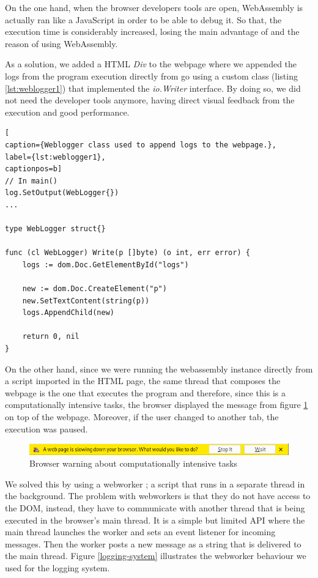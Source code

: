 On the one hand, when the browser developers tools are open, WebAssembly is actually ran like a JavaScript in order to be able to debug it. So that, the execution time is considerably increased, losing the main advantage of and the reason of using WebAssembly.

As a solution, we added a HTML \textit{Div} to the webpage where we appended the logs from the program execution directly from go using a custom class (listing \ref{lst:weblogger1}) that implemented the \textit{io.Writer} interface. By doing so, we did not need the developer tools anymore, having direct visual feedback from the execution and good performance.

\begin{lstlisting}[
caption={Weblogger class used to append logs to the webpage.},
label={lst:weblogger1},
captionpos=b]
// In main()
log.SetOutput(WebLogger{})
...

type WebLogger struct{}

func (cl WebLogger) Write(p []byte) (o int, err error) {
	logs := dom.Doc.GetElementById("logs")

	new := dom.Doc.CreateElement("p")
	new.SetTextContent(string(p))
	logs.AppendChild(new)

	return 0, nil
}
\end{lstlisting} 

On the other hand, since we were running the webassembly instance directly from a script imported in the HTML page, the same thread that composes the webpage is the one that executes the program and therefore, since this is a computationally intensive tasks, the browser displayed the message from figure \ref{image:kill-task} on top of the webpage. Moreover, if the user changed to another tab, the execution was paused.

\begin{figure}[h!]
		\centering
    	\includegraphics[width=\linewidth]{assets/images/browser-warning.png}
    	\caption{Browser warning about computationally intensive tasks}
    	\label{image:kill-task}
\end{figure} 

We solved this by using a webworker \cite{webworker}; a script that runs in a separate thread in the background. The problem with webworkers is that they do not have access to the DOM, instead, they have to communicate with another thread that is being executed in the browser's main thread. It is a simple but limited API where the main thread launches the worker and sets an event listener for incoming messages. Then the worker posts a new message as a string that is delivered to the main thread. Figure \ref{logging-system} illustrates the webworker behaviour we used for the logging system.

